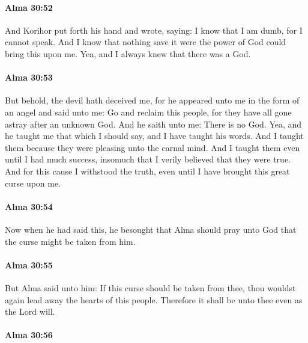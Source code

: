 		\paragraph{Alma 30:52} %
			\label{ALMA-30-52}

			And Korihor put forth his hand and wrote, saying:
			I know that I am dumb, for I cannot speak.
			And I know that nothing save it were the power of God could bring this upon me.
			Yea, and I always knew that there was a God.

		\paragraph{Alma 30:53} %
			\label{ALMA-30-53}

			But behold, the devil hath deceived me,
			for he appeared unto me in the form of an angel and said unto me:
			Go and reclaim this people,
			for they have all gone astray after an unknown God.
			And he saith unto me:
			There is no God.
			Yea, and he taught me that which I should say,
			and I have taught his words.
			And I taught them because they were pleasing unto the carnal mind.
			And I taught them even until I had much success,
			insomuch that I verily believed that they were true.
			And for this cause I withstood the truth,
			even until I have brought this great curse upon me.

		\paragraph{Alma 30:54} %
			\label{ALMA-30-54}

			Now when he had said this,
			he besought that Alma should pray unto God
			that the curse might be taken from him.

		\paragraph{Alma 30:55} %
			\label{ALMA-30-55}

			But Alma said unto him:
			If this curse should be taken from thee,
			thou wouldst again lead away the hearts of this people.
			Therefore it shall be unto thee even as the Lord will.

		\paragraph{Alma 30:56} %
			\label{ALMA-30-56}

